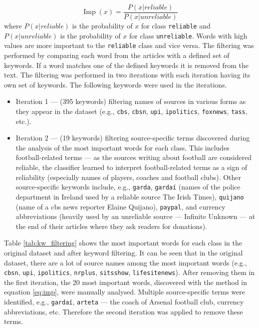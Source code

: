 \begin{equation}
    \operatorname{Imp}(x) = \displaystyle{\frac{P (x | reliable)} {P (x | unreliable)}}
    \label{eq:imp}
\end{equation}
where $P (x | reliable)$ is the probability of $x$ for class \texttt{reliable} and $P (x | unreliable)$ is the probability of $x$ for class \texttt{unreliable}. Words with high values are more important to the \texttt{reliable} class and vice versa. The filtering was performed by comparing each word from the articles with a defined set of keywords. If a word matches one of the defined keywords it is removed from the text. The filtering was performed in two iterations with each iteration having its own set of keywords. The following keywords were used in the iterations.

\begin{itemize}
    \item Iteration 1 --- (395 keywords) filtering names of sources in various forms as they appear in the dataset (e.g., \texttt{cbs}, \texttt{cbsn}, \texttt{upi}, \texttt{ipolitics}, \texttt{foxnews}, \texttt{tass}, etc.).
    \item Iteration 2 --- (19 keywords) filtering source-specific terms discovered during the analysis of the most important words for each class. This includes football-related terms --- as the sources writing about football are considered reliable, the classifier learned to interpret football-related terms as a sign of reliability (especially names of players, coaches and football clubs). Other source-specific keywords include, e.g., \texttt{garda}, \texttt{gardaí} (names of the police department in Ireland used by a reliable source The Irish Times), \texttt{quijano} (name of a cbs news reporter Elaine Quijano), \texttt{paypal}, and currency abbreviations (heavily used by an unreliable source --- Infinite Unknown --- at the end of their articles where they ask readers for donations).
\end{itemize}

Table \ref{tab:kw_filtering} shows the most important words for each class in the original dataset and after keyword filtering. It can be seen that in the original dataset, there are a lot of source names among the most important words (e.g., \texttt{cbsn}, \texttt{upi}, \texttt{ipolitics}, \texttt{nrplus}, \texttt{sitsshow}, \texttt{lifesitenews}). After removing them in the first iteration, the 20 most important words, discovered with the method in equation \ref{eq:imp}, were manually analysed. Multiple source-specific terms were identified, e.g., \texttt{gardaí}, \texttt{arteta} --- the coach of Arsenal football club, currency abbreviations, etc. Therefore the second iteration was applied to remove these terms.


